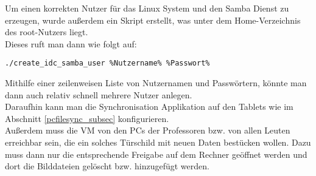 \begin{flushleft}
Um einen korrekten Nutzer für das Linux System und den Samba Dienst zu erzeugen, wurde außerdem ein Skript erstellt, was unter dem Home-Verzeichnis des root-Nutzers liegt.\\

Dieses ruft man dann wie folgt auf:
\vspace{.3cm}
\begin{center}
\verb|./create_idc_samba_user %Nutzername% %Passwort%|
\end{center}
\vspace{.3cm}
Mithilfe einer zeilenweisen Liste von Nutzernamen und Passwörtern, könnte man dann auch relativ schnell mehrere Nutzer anlegen.\\

Daraufhin kann man die Synchronisation Applikation auf den Tablets wie im Abschnitt \ref{pcfilesync_subsec}  konfigurieren.\\

Außerdem muss die VM von den PCs der Professoren bzw. von allen Leuten erreichbar sein, die ein solches Türschild mit neuen Daten bestücken wollen. Dazu muss dann nur die entsprechende Freigabe auf dem Rechner geöffnet werden und dort die Bilddateien gelöscht bzw. hinzugefügt werden. 


\end{flushleft}

